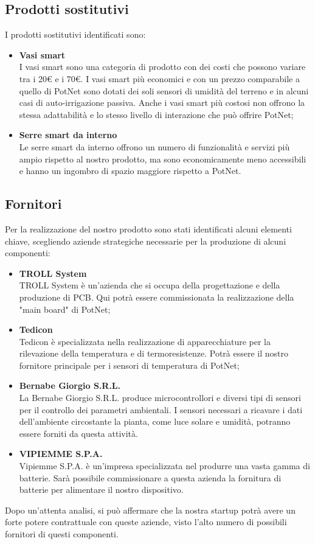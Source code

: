 \subsection{Prodotti sostitutivi}
I prodotti sostitutivi identificati sono:
\begin{itemize}
	\item \textbf{Vasi smart}\\
	I vasi smart sono una categoria di prodotto con dei costi che possono variare tra i 20€ e i 70€. I vasi smart più economici e con un prezzo comparabile a quello di PotNet sono dotati dei soli sensori di umidità del terreno e in alcuni casi di auto-irrigazione passiva. Anche i vasi smart più costosi non offrono la stessa adattabilità e lo stesso livello di interazione che può offrire PotNet;
	\item \textbf{Serre smart da interno}\\
	Le serre smart da interno offrono un numero di funzionalità e servizi più ampio rispetto al nostro prodotto, ma sono economicamente meno accessibili e hanno un ingombro di spazio maggiore rispetto a PotNet.
\end{itemize}

\subsection{Fornitori}
Per la realizzazione del nostro prodotto sono stati identificati alcuni elementi chiave, scegliendo aziende strategiche necessarie per la produzione di alcuni componenti:
\begin{itemize}
	\item \textbf{TROLL System}\\
	TROLL System è un’azienda che si occupa della progettazione e della produzione di PCB. Qui potrà essere commissionata la realizzazione della "main board" di PotNet;
	
	\item \textbf{Tedicon}\\
	Tedicon è specializzata nella realizzazione di apparecchiature per la rilevazione della temperatura e di termoresistenze. Potrà essere il nostro fornitore principale per i sensori di temperatura di PotNet;
	
	\item \textbf{Bernabe Giorgio S.R.L.}\\
	La Bernabe Giorgio S.R.L. produce microcontrollori e diversi tipi di sensori per il controllo dei parametri ambientali. I sensori necessari a ricavare i dati dell’ambiente circostante la pianta, come luce solare e umidità, potranno essere forniti da questa attività.
	
	\item \textbf{VIPIEMME S.P.A.}\\
	Vipiemme S.P.A. è un’impresa specializzata nel produrre una vasta gamma di batterie. Sarà possibile commissionare a questa azienda la fornitura di batterie per alimentare il nostro dispositivo.
\end{itemize}

Dopo un'attenta analisi, si può affermare che la nostra startup potrà avere un forte potere contrattuale con queste aziende, visto l'alto numero di possibili fornitori di questi componenti.